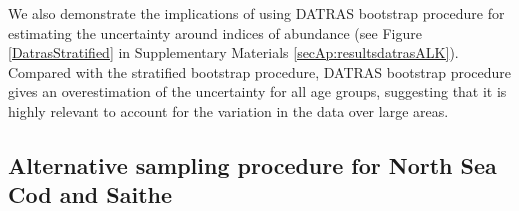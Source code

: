 \documentclass[a4paper 12pt]{article}
\numberwithin{equation}{section}
\begin{document}
\begin{figure}[h!]
\end{figure}

We also demonstrate the implications of using DATRAS bootstrap procedure for estimating the uncertainty around indices of abundance (see Figure \ref{DatrasStratified} in Supplementary Materials \ref{secAp:resultsdatrasALK}). Compared with the stratified bootstrap procedure, DATRAS bootstrap procedure gives an overestimation of the uncertainty for all age groups, suggesting that it is highly relevant to account for the variation in the data over large areas. 


\subsection{Alternative sampling procedure for North Sea Cod and Saithe}
\label{sec:optimumeffortresults}
\end{document}
